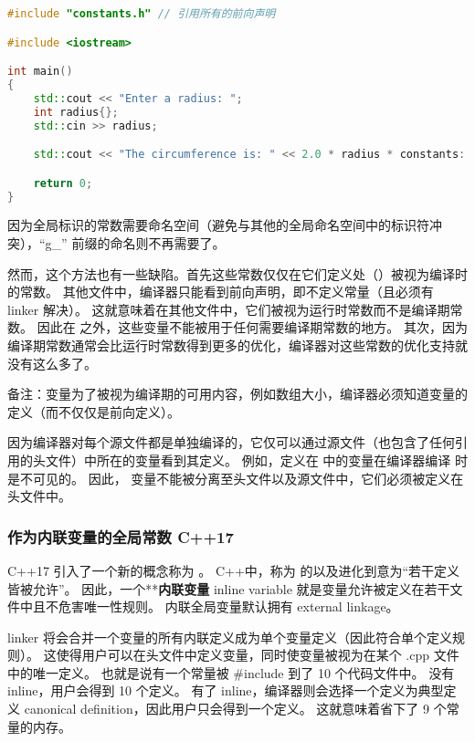\documentclass[../../LearnCpp.tex]{subfiles}
\begin{document}
\begin{lstlisting}[language=C++]
#include "constants.h" // 引用所有的前向声明

#include <iostream>

int main()
{
    std::cout << "Enter a radius: ";
    int radius{};
    std::cin >> radius;

    std::cout << "The circumference is: " << 2.0 * radius * constants::pi << '\n';

    return 0;
}
\end{lstlisting}

因为全局标识的常数需要命名空间（避免与其他的全局命名空间中的标识符冲突），“g\_” 前缀的命名则不再需要了。

然而，这个方法也有一些缺陷。首先这些常数仅仅在它们定义处（）被视为编译时的常数。
其他文件中，编译器只能看到前向声明，即不定义常量（且必须有 linker 解决）。
这就意味着在其他文件中，它们被视为运行时常数而不是编译期常数。
因此在  之外，这些变量不能被用于任何需要编译期常数的地方。
其次，因为编译期常数通常会比运行时常数得到更多的优化，编译器对这些常数的优化支持就没有这么多了。

备注：变量为了被视为编译期的可用内容，例如数组大小，编译器必须知道变量的定义（而不仅仅是前向定义）。

因为编译器对每个源文件都是单独编译的，它仅可以通过源文件（也包含了任何引用的头文件）中所在的变量看到其定义。
例如，定义在  中的变量在编译器编译  时是不可见的。
因此， 变量不能被分离至头文件以及源文件中，它们必须被定义在头文件中。

\subsubsection*{作为内联变量的全局常数 C++17}

C++17 引入了一个新的概念称为 。
C++中，称为  的以及进化到意为“若干定义皆被允许”。
因此，一个**\textbf{内联变量} inline variable 就是变量允许被定义在若干文件中且不危害唯一性规则。
内联全局变量默认拥有 external linkage。

linker 将会合并一个变量的所有内联定义成为单个变量定义（因此符合单个定义规则）。
这使得用户可以在头文件中定义变量，同时使变量被视为在某个 .cpp 文件中的唯一定义。
也就是说有一个常量被 \#include 到了 10 个代码文件中。
没有 inline，用户会得到 10 个定义。
有了 inline，编译器则会选择一个定义为典型定义 canonical definition，因此用户只会得到一个定义。
这就意味着省下了 9 个常量的内存。
\end{document}
